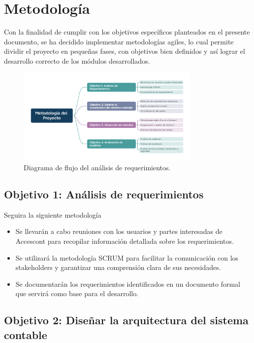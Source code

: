 \documentclass{article}
\begin{document}
\section{Metodología}

Con la finalidad de cumplir con los objetivos específicos planteados en el presente documento, se ha decidido implementar metodologías agiles, lo cual permite dividir el proyecto en pequeñas fases, con objetivos bien definidos y así lograr el desarrollo correcto de los módulos desarrollados.  

\begin{figure}[h]
    \centering
    \includegraphics[width=0.8\textwidth]{med.png}
    \caption{Diagrama de flujo del análisis de requerimientos.}
\end{figure}

\subsection{Objetivo 1: Análisis de requerimientos}

Seguira la siguiente metodología

\begin{itemize}
    \item Se llevarán a cabo reuniones con los usuarios y partes interesadas de Accescont para recopilar información detallada sobre los requerimientos.
    \item Se utilizará la metodología SCRUM para facilitar la comunicación con los stakeholders y garantizar una comprensión clara de sus necesidades.
    \item Se documentarán los requerimientos identificados en un documento formal que servirá como base para el desarrollo.
\end{itemize}

\subsection{Objetivo 2: Diseñar la arquitectura del sistema contable}
\end{document}
